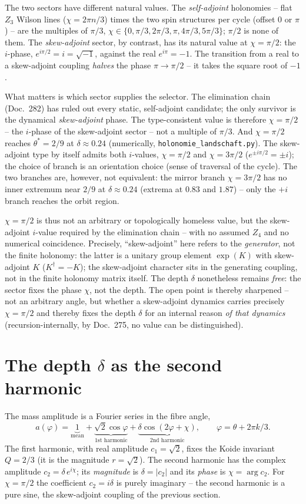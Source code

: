The two sectors have different natural values. The \emph{self-adjoint} holonomies -- flat $Z_3$
Wilson lines ($\chi=2\pi n/3$) times the two spin structures per cycle (offset $0$ or $\pi$) --
are the multiples of $\pi/3$, $\chi\in\{0,\pi/3,2\pi/3,\pi,4\pi/3,5\pi/3\}$; $\pi/2$ is none of
them. The \emph{skew-adjoint} sector, by contrast, has its natural value at $\chi=\pi/2$: the
$i$-phase, $e^{i\pi/2}=i=\sqrt{-1}$, against the real $e^{i\pi}=-1$. The transition from a real
to a skew-adjoint coupling \emph{halves} the phase $\pi\to\pi/2$ -- it takes the square root of
$-1$.

What matters is which sector supplies the selector. The elimination chain (Doc.~282) has ruled
out every static, self-adjoint candidate; the only survivor is the dynamical \emph{skew-adjoint}
phase. The type-consistent value is therefore $\chi=\pi/2$ -- the $i$-phase of the skew-adjoint
sector -- not a multiple of $\pi/3$. And $\chi=\pi/2$ reaches $\theta^*=2/9$ at
$\delta\approx0.24$ (numerically, \texttt{holonomie\_landschaft.py}). The skew-adjoint type by
itself admits both $i$-values, $\chi=\pi/2$ and $\chi=3\pi/2$ ($e^{\pm i\pi/2}=\pm i$); the
choice of branch is an orientation choice (sense of traversal of the cycle). The two branches
are, however, not equivalent: the mirror branch $\chi=3\pi/2$ has no inner extremum near $2/9$
at $\delta\approx0.24$ (extrema at $0.83$ and $1.87$) -- only the $+i$ branch reaches the orbit
region.

$\chi=\pi/2$ is thus not an arbitrary or topologically homeless value, but the skew-adjoint
$i$-value required by the elimination chain -- with no assumed $Z_4$ and no numerical
coincidence. Precisely, \enquote{skew-adjoint} here refers to the \emph{generator}, not the
finite holonomy: the latter is a unitary group element $\exp(K)$ with skew-adjoint $K$
($K^\dagger=-K$); the skew-adjoint character sits in the generating coupling, not in the finite
holonomy matrix itself. The depth $\delta$ nonetheless remains \emph{free}: the sector fixes the
phase $\chi$, not the depth. The open point is thereby sharpened -- not an arbitrary angle, but
whether a skew-adjoint dynamics carries precisely $\chi=\pi/2$ and thereby fixes the depth
$\delta$ for an internal reason \emph{of that dynamics} (recursion-internally, by Doc.~275, no
value can be distinguished).

\section{The depth $\delta$ as the second harmonic}
The mass amplitude is a Fourier series in the fibre angle,
\[
a(\varphi)=\underbrace{1}_{\text{mean}}+\underbrace{\sqrt2\cos\varphi}_{\text{1st harmonic}}
+\underbrace{\delta\cos(2\varphi+\chi)}_{\text{2nd harmonic}},\qquad \varphi=\theta+2\pi k/3.
\]
The first harmonic, with real amplitude $c_1=\sqrt2$, fixes the Koide invariant $Q=2/3$ (it is
the magnitude $r=\sqrt2$). The second harmonic has the complex amplitude $c_2=\delta\,e^{i\chi}$;
its \emph{magnitude} is $\delta=|c_2|$ and its \emph{phase} is $\chi=\arg c_2$. For $\chi=\pi/2$
the coefficient $c_2=i\delta$ is purely imaginary -- the second harmonic is a pure sine, the
skew-adjoint coupling of the previous section.

